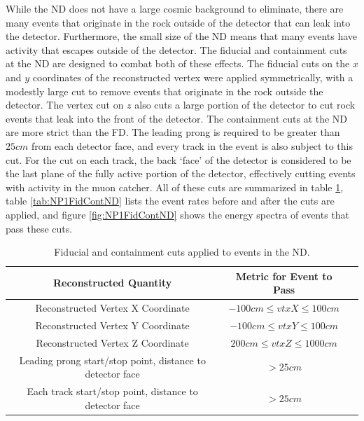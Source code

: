 While the ND does not have a large cosmic background to eliminate, there are many events that originate in the rock outside of the detector that can leak into the detector. Furthermore, the small size of the ND means that many events have activity that escapes outside of the detector. The fiducial and containment cuts at the ND are designed to combat both of these effects. The fiducial cuts on the $x$ and $y$ coordinates of the reconstructed vertex were applied symmetrically, with a modestly large cut to remove events that originate in the rock outside the detector. The vertex cut on $z$ also cuts a large portion of the detector to cut rock events that leak into the front of the detector. The containment cuts at the ND are more strict than the FD. The leading prong is required to be greater than $25\unit{cm}$ from each detector face, and every track in the event is also subject to this cut. For the cut on each track, the back `face' of the detector is considered to be the last plane of the fully active portion of the detector, effectively cutting events with activity in the muon catcher. All of these cuts are summarized in table \ref{tab:FidContND}, table \ref{tab:NP1FidContND} lists the event rates before and after the cuts are applied, and figure \ref{fig:NP1FidContND} shows the energy spectra of events that pass these cuts.
\begin{table}[htb]
  \begin{center}
    \begin{tabular}{c c c}
      \hline\hline
      Reconstructed Quantity & Metric for Event to Pass \\
      \hline
      Reconstructed Vertex X Coordinate & $-100\unit{cm} \leq vtxX \leq 100\unit{cm} $ \\
      Reconstructed Vertex Y Coordinate & $-100\unit{cm} \leq vtxY \leq 100\unit{cm}$ \\
      Reconstructed Vertex Z Coordinate & $200\unit{cm} \leq vtxZ \leq 1000\unit{cm}$ \\
      Leading prong start/stop point, distance to detector face & $> 25\unit{cm}$ \\
      Each track start/stop point, distance to detector face & $> 25\unit{cm}$ \\
      \hline
    \end{tabular}
    \caption[ND Fiducial and Containment Cuts]{Fiducial and containment cuts applied to events in the ND.}
    \label{tab:FidContND}
  \end{center}
\end{table}

